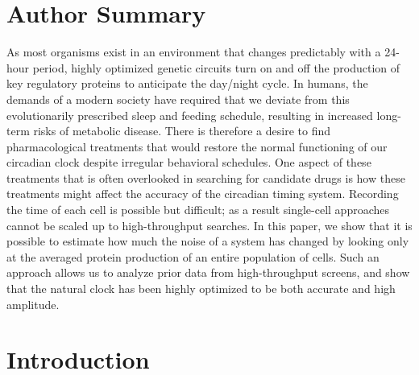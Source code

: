 \documentclass[11pt, letterpaper]{article}
\begin{document}
\section*{Author Summary}

As most organisms exist in an environment that changes predictably with a 24-hour period, highly optimized genetic circuits turn on and off the production of key regulatory proteins to anticipate the day/night cycle.
In humans, the demands of a modern society have required that we deviate from this evolutionarily prescribed sleep and feeding schedule, resulting in increased long-term risks of metabolic disease.
There is therefore a desire to find pharmacological treatments that would restore the normal functioning of our circadian clock despite irregular behavioral schedules.
One aspect of these treatments that is often overlooked in searching for candidate drugs is how these treatments might affect the accuracy of the circadian timing system.
Recording the time of each cell is possible but difficult; as a result single-cell approaches cannot be scaled up to high-throughput searches.
In this paper, we show that it is possible to estimate how much the noise of a system has changed by looking only at the averaged protein production of an entire population of cells.
Such an approach allows us to analyze prior data from high-throughput screens, and show that the natural clock has been highly optimized to be both accurate and high amplitude.



\section*{Introduction}
\end{document}
